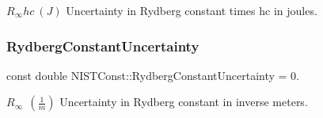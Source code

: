 $R_\infty hc \ (J)$ Uncertainty in Rydberg constant times hc in joules. \mbox{\label{group___rydberg_constant_ga694e342f62e81330dcc1b1469acc945c}} 
\subsubsection{\texorpdfstring{Rydberg\+Constant\+Uncertainty}{RydbergConstantUncertainty}}
{\footnotesize\ttfamily const double N\+I\+S\+T\+Const\+::\+Rydberg\+Constant\+Uncertainty = 0.}

$R_\infty \ \ (\frac{1}{m})$ Uncertainty in Rydberg constant in inverse meters. 